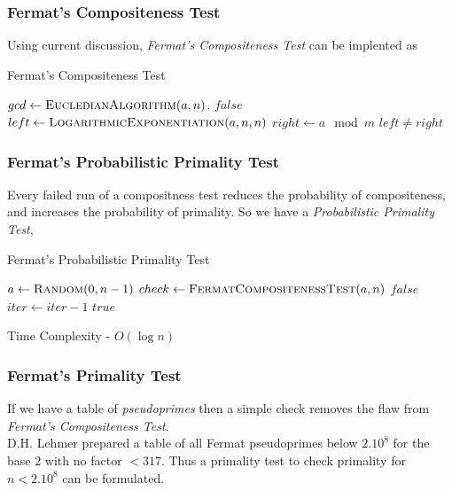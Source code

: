 \documentclass{beamer}
\begin{document}
\begin{frame}
\frametitle{Fermat's Compositeness Test}
Using current discussion, \emph{Fermat's Compositeness Test} can be implented as
\begin{algorithm}[H]
\caption{Fermat's Compositeness Test}
\label{alg:FermatCompositenessTest}
\begin{algorithmic}
\State $gcd \gets \Call{EucledianAlgorithm}{a, n}$.
	\State \Return $false$
\EndIf
\State $left \gets \Call{LogarithmicExponentiation}{a,n,n}$
\State $right \gets a \mod m$
\State \Return $left \neq right$
\EndProcedure
\end{algorithmic}
\end{algorithm}

\end{frame}

\begin{frame}
\frametitle{Fermat's Probabilistic Primality Test}

Every failed run of a compositness test reduces the probability of compositeness, and increases the probability of primality. So we have a \emph{Probabilistic Primality Test},

\begin{algorithm}[H]
\caption{Fermat's Probabilistic Primality Test}
\label{alg:FermatProbabilisticPrimalityTest}
\begin{algorithmic}
 
	\State $a \gets \Call{Random}{0,n-1}$ 
	\State $check \gets \Call{FermatCompositenessTest}{a,n}$
		\State \Return $false$ 
	\EndIf
	\State $iter \gets iter-1$
\EndWhile
\State \Return $true$ 
\EndProcedure
\end{algorithmic}
\end{algorithm}

Time Complexity - $O(\log n)$

\end{frame}

\begin{frame}
\frametitle{Fermat's Primality Test}
If we have a table of \emph{pseudoprimes} then a simple check removes the flaw from \emph{Fermat's Compositeness Test}.
\\[3mm]
D.H. Lehmer prepared a table of all Fermat pseudoprimes below $2.10^8$ for the base $2$ with no factor $< 317$. Thus a primality test to check primality for $n < 2.10^8$ can be formulated.
\end{frame}
\end{document}
